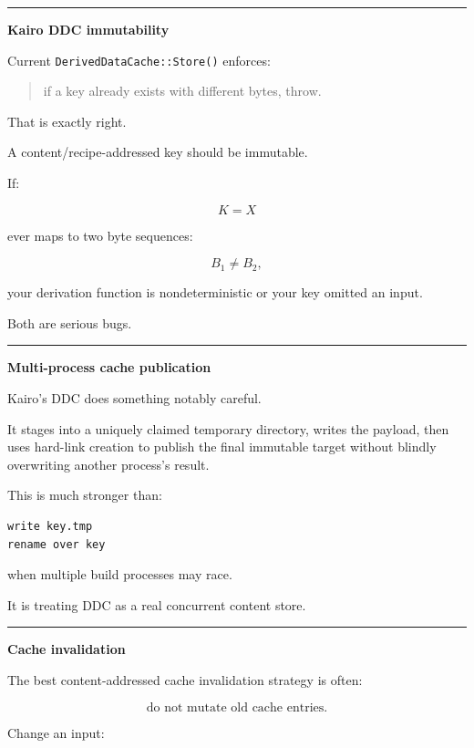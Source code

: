 \begin{center}\rule{0.5\linewidth}{0.5pt}\end{center}

\textbf{Kairo DDC immutability}

Current \texttt{DerivedDataCache::Store()} enforces:

\begin{quote}
if a key already exists with different bytes, throw.
\end{quote}

That is exactly right.

A content/recipe-addressed key should be immutable.

If:

\[
K=X
\]

ever maps to two byte sequences:

\[
B_1\neq B_2,
\]

your derivation function is nondeterministic or your key omitted an input.

Both are serious bugs.

\begin{center}\rule{0.5\linewidth}{0.5pt}\end{center}

\textbf{Multi-process cache publication}

Kairo's DDC does something notably careful.

It stages into a uniquely claimed temporary directory, writes the payload, then uses hard-link creation to publish the final immutable target without blindly overwriting another process's result.

This is much stronger than:

\begin{verbatim}
write key.tmp
rename over key
\end{verbatim}

when multiple build processes may race.

It is treating DDC as a real concurrent content store.

\begin{center}\rule{0.5\linewidth}{0.5pt}\end{center}

\textbf{Cache invalidation}

The best content-addressed cache invalidation strategy is often:

\[
\boxed{
\text{do not mutate old cache entries}.
}
\]

Change an input:

